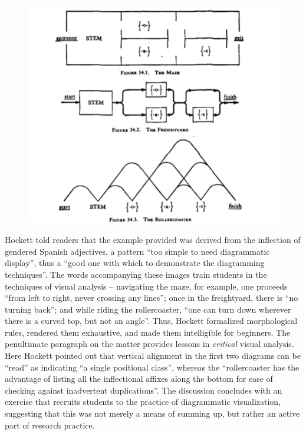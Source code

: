 \documentclass[output=paper]{langscibook}
\begin{document}
\begin{figure}
    \centering
    \includegraphics[scale=1]{figures/hockett1958-291.png}
    \caption{\citet[291]{Hockett19591958}}
    \label{fig:kaplan:hockett1959291}
\end{figure}

Hockett told readers that the example provided was derived from the inflection of gendered Spanish adjectives, a pattern ``too simple to need diagrammatic display'', thus a ``good one with which to demonstrate the diagramming techniques''. The words accompanying these images train students in the techniques of visual analysis -- navigating the maze, for example, one proceeds ``from left to right, never crossing any lines''; once in the freightyard, there is ``no turning back''; and while riding the rollercoaster, ``one can turn down wherever there is a curved top, but not an angle''. Thus, Hockett formalized morphological rules, rendered them exhaustive, and made them intelligible for beginners. The penultimate paragraph on the matter provides lessons in \emph{critical} visual analysis. Here Hockett pointed out that vertical alignment in the first two diagrams can be ``read'' as indicating ``a single positional class'', whereas the ``rollercoaster has the advantage of listing all the inflectional affixes along the bottom for ease of checking against inadvertent duplications''. The discussion concludes with an exercise that recruits students to the practice of diagrammatic visualization, suggesting that this was not merely a means of summing up, but rather an active part of research practice.
\end{document}
